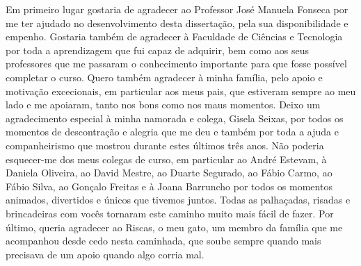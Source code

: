 \acknowledgements

Em primeiro lugar gostaria de agradecer ao Professor José Manuela Fonseca por me ter ajudado no desenvolvimento desta dissertação, pela sua disponibilidade e empenho.
Gostaria também de agradecer à Faculdade de Ciências e Tecnologia por toda a aprendizagem que fui capaz de adquirir, bem como aos seus professores que me passaram o conhecimento importante para que fosse possível completar o curso.
Quero também agradecer à minha família, pelo apoio e motivação excecionais, em particular aos meus pais, que estiveram sempre ao meu lado e me apoiaram, tanto nos bons como nos maus momentos.
Deixo um agradecimento especial à minha namorada e colega, Gisela Seixas, por todos os momentos de descontração e alegria que me deu e também por toda a ajuda e companheirismo que mostrou durante estes últimos três anos.
Não poderia esquecer-me dos meus colegas de curso, em particular ao André Estevam, à Daniela Oliveira, ao David Mestre, ao Duarte Segurado, ao Fábio Carmo, ao Fábio Silva, ao Gonçalo Freitas e à Joana Barruncho por todos os momentos animados, divertidos e únicos que tivemos juntos. Todas as palhaçadas, risadas e brincadeiras com vocês tornaram este caminho muito mais fácil de fazer.
Por último, queria agradecer ao Riscas, o meu gato, um membro da família que me acompanhou desde cedo nesta caminhada, que soube sempre quando mais precisava de um apoio quando algo corria mal.